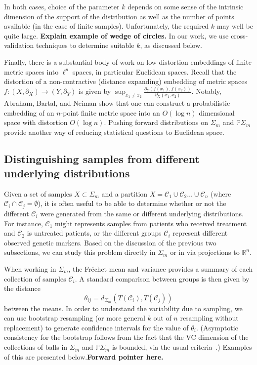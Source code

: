 \documentclass[a4paper,11pt]{article}
\newcommand{\aC}{\mathcal{C}}
\begin{document}
In both cases, choice of the parameter $k$ depends on some sense of the intrinsic dimension of the support of the distribution as well as the number of points available (in the case of finite samples).
Unfortunately, the required $k$ may well be quite large.
{\bf Explain example of wedge of circles.}
In our work, we use cross-validation techniques to determine suitable $k$, as discussed below.

Finally, there is a substantial body of work on low-distortion embeddings of finite metric spaces into $\ell^p$ spaces, in particular Euclidean spaces.
Recall that the distortion of a non-contractive (distance expanding) embedding of metric spaces $f \colon (X, \partial_X) \to (Y, \partial_Y)$ is given by $\sup_{x_1 \neq x_2} \frac{\partial_Y (f(x_1), f(x_2))}{\partial_X (x_1, x_2)}$.
Notably, Abraham, Bartal, and Neiman show that one can construct a probabilistic embedding of an $n$-point finite metric space into an $O(\log n)$ dimensional space with distortion $O(\log n)$.
Pushing forward distributions on $\Sigma_m$ and $\mathbb{P}\Sigma_m$ provide another way of reducing statistical questions to Euclidean space.

\subsection{Distinguishing samples from different underlying distributions}

Given a set of samples $X \subset \Sigma_m$ and a partition $X = \aC_1 \cup \aC_2 \ldots \cup \aC_n$ (where $\aC_i \cap \aC_j = \emptyset$), it is often useful to be able to determine whether or not the different $\aC_i$ were generated from the same or different underlying distributions.
For instance, $\aC_1$ might represents samples from patients who received treatment and $\aC_2$ is untreated patients, or the different groups $\aC_i$ represent different observed genetic markers.
Based on the discussion of the previous two subsections, we can study this problem directly in $\Sigma_m$ or in via projections to $\mathbb{R}^n$.

When working in $\Sigma_m$, the Fr\'echet mean and variance provides a summary of each collection of samples $\aC_i$.
A standard comparison between groups is then given by the distance 
\[
\theta_{ij} = d_{\Sigma_m}(T(\aC_i), T(\aC_j))
\]
between the means.
In order to understand the variability due to sampling, we can use bootstrap resampling (or more general $k$ out of $n$ resampling without replacement) to generate confidence intervals for the value of $\theta_i$.
(Asymptotic consistency for the bootstrap follows from the fact that the VC dimension of the collections of balls in $\Sigma_m$ and $\mathbb{P}\Sigma_m$ is bounded, via the usual criteria~\cite{Gine1984, Gine1986, Gine1990}.) 
Examples of this are presented below.{\bf Forward pointer here.}
\end{document}
